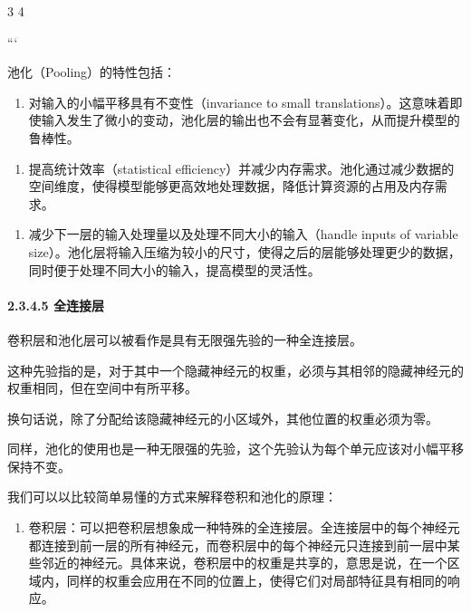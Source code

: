 3 4

```

池化（Pooling）的特性包括：

\begin{enumerate}
\def\labelenumi{\arabic{enumi}.}
\item
  对输入的小幅平移具有不变性（invariance to small
  translations）。这意味着即使输入发生了微小的变动，池化层的输出也不会有显著变化，从而提升模型的鲁棒性。
\end{enumerate}

\begin{enumerate}
\def\labelenumi{\arabic{enumi}.}
\item
  提高统计效率（statistical
  efficiency）并减少内存需求。池化通过减少数据的空间维度，使得模型能够更高效地处理数据，降低计算资源的占用及内存需求。
\end{enumerate}

\begin{enumerate}
\def\labelenumi{\arabic{enumi}.}
\item
  减少下一层的输入处理量以及处理不同大小的输入（handle inputs of
  variable
  size）。池化层将输入压缩为较小的尺寸，使得之后的层能够处理更少的数据，同时便于处理不同大小的输入，提高模型的灵活性。
\end{enumerate}

\paragraph{\texorpdfstring{\textbf{2.3.4.5}
\textbf{全连接层}}{2.3.4.5 全连接层}}\label{2345-ux5168ux8fdeux63a5ux5c42}

卷积层和池化层可以被看作是具有无限强先验的一种全连接层。

这种先验指的是，对于其中一个隐藏神经元的权重，必须与其相邻的隐藏神经元的权重相同，但在空间中有所平移。

换句话说，除了分配给该隐藏神经元的小区域外，其他位置的权重必须为零。

同样，池化的使用也是一种无限强的先验，这个先验认为每个单元应该对小幅平移保持不变。

我们可以以比较简单易懂的方式来解释卷积和池化的原理：

\begin{enumerate}
\def\labelenumi{\arabic{enumi}.}
\item
  卷积层：可以把卷积层想象成一种特殊的全连接层。全连接层中的每个神经元都连接到前一层的所有神经元，而卷积层中的每个神经元只连接到前一层中某些邻近的神经元。具体来说，卷积层中的权重是共享的，意思是说，在一个区域内，同样的权重会应用在不同的位置上，使得它们对局部特征具有相同的响应。
\end{enumerate}


